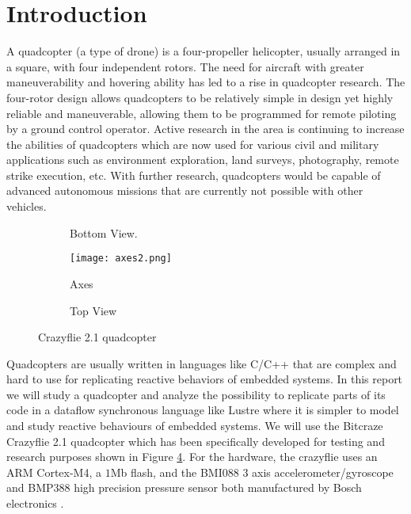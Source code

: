 \documentclass[10pt, a4paper]{article}
\newcommand{\fig}[1]{Figure \ref{#1}}
\begin{document}
\section{Introduction}
    A quadcopter (a type of drone) is a four-propeller helicopter, usually arranged in a square, with four independent rotors. The need for aircraft with greater maneuverability and hovering ability has led to a rise in quadcopter research. The four-rotor design allows quadcopters to be relatively simple in design yet highly reliable and maneuverable, allowing them to be programmed for remote piloting by a ground control operator. Active research in the area is continuing to increase the abilities of quadcopters which are now used for various civil and military applications such as environment exploration, land surveys, photography, remote strike execution, etc. With further research, quadcopters would be capable of advanced autonomous missions that are currently not possible with other vehicles. \\

\begin{figure}[hbt!]
    \centering
    \begin{subfigure}[b]{0.28\linewidth}
        \caption{Bottom View.}
        \label{bottom}
    \end{subfigure}
    \hfill
    \begin{subfigure}[b]{0.35\textwidth}
        \centering
        \texttt{[image: axes2.png]}
        \caption{Axes}
        \label{axes}
    \end{subfigure}
    \hfill
    \begin{subfigure}[b]{0.31\textwidth}
        \caption{Top View}
        \label{axes}
    \end{subfigure}
    \caption{Crazyflie 2.1 quadcopter}
    \label{Crazyflie}
\end{figure}

    Quadcopters are usually written in languages like C/C++ that are complex and hard to use for replicating reactive behaviors of embedded systems. In this report we will study a quadcopter and analyze the possibility to replicate parts of its code in a dataflow synchronous language like Lustre where it is simpler to model and study reactive behaviours of embedded systems. We will use the Bitcraze Crazyflie 2.1 quadcopter which has been specifically developed for testing and research purposes shown in \fig{Crazyflie}. For the hardware, the crazyflie uses an ARM Cortex-M4, a $1$Mb flash, and the BMI$088$ 3 axis accelerometer/gyroscope and BMP$388$ high precision pressure sensor both manufactured by Bosch electronics \cite{bitcraze}.
    
\end{document}
